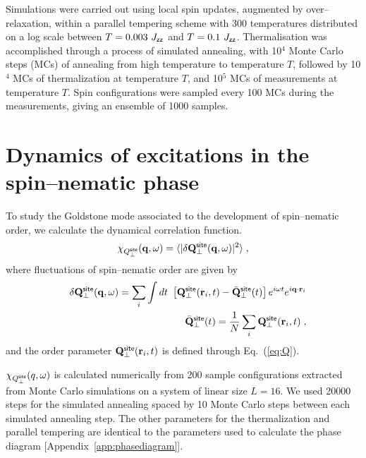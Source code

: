 \documentclass[apsrev4-1,prx,superscriptaddress,floatfix,twocolumn,longbibliography]{revtex4-1}
\begin{document}
\begin{appendix}

Simulations were carried out using local spin updates, augmented by over--relaxation, 
within a parallel tempering scheme with 300 temperatures distributed on a log scale 
between $T= 0.003\  J_{\sf zz}$ and $T=  0.1 \  J_{\sf zz}$.   
%
Thermalisation was accomplished through a process of simulated annealing,
with 10$^4$ Monte Carlo steps (MCs) of annealing from high temperature to temperature $T$, 
followed by 10$^4$ MCs of thermalization at temperature $T$, and 10$^5$ MCs of measurements 
at temperature $T$.
%
Spin configurations were sampled every 100 MCs during the measurements, 
giving an ensemble of 1000 samples.

\section{Dynamics of excitations in the spin--nematic phase}
\label{app:goldstone}

To study the Goldstone mode associated to the
development of spin--nematic order, we calculate the dynamical
correlation function.
%
\begin{equation}
  \chi_{Q_\perp^{\sf site}} ({\bf q},\omega) = \langle| \delta{\bf Q}^{\sf site}_\perp({\bf q},\omega) |^2\rangle \; ,
\end{equation}
%
where fluctuations of spin--nematic order are given by 
%
\begin{eqnarray}
  &&\delta{\bf Q}^{\sf site}_\perp({\bf q},\omega) 
  = \sum_{i} \int dt\ \left[ {\bf Q}^{\sf site}_\perp({\bf r}_i, t) 
   - \bar{\bf Q}^{\sf site}_\perp(t)  \right] 
  e^{i  \omega t} e^{i {\bf q}\cdot {\bf r}_i} 
   \nonumber \\
&&
   \bar{\bf Q}^{\sf site}_\perp(t)
   = \frac{1}{N} \sum_i {\bf Q}^{\sf site}_\perp({\bf r}_i, t) \; ,
\end{eqnarray}
%
and the order parameter ${\bf Q}^{\sf site}_\perp({\bf r}_i, t)$  is defined 
through Eq.~(\ref{eq:Q}).


$\chi_{Q_{\perp}^{\sf site}}(q,\omega)$ is calculated numerically from 200 sample
configurations extracted
from Monte Carlo simulations on a system of linear size $L=16$. 
%
We used
20000 steps for the simulated annealing spaced by 10 Monte Carlo steps
between each simulated annealing step. 
%
The other parameters for the
thermalization and parallel tempering are identical to the parameters
used to calculate the phase diagram [Appendix~\ref{app:phasediagram}]. 


\end{appendix}
\end{document}

